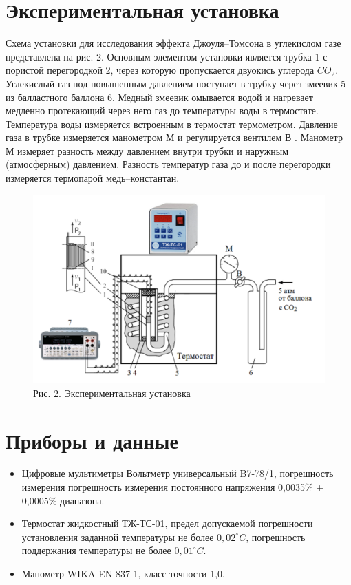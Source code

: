 \documentclass[a4paper]{article}
\begin{document}
\section{Экспериментальная установка}
Схема установки для исследования эффекта Джоуля–Томсона в углекислом газе
представлена на рис. 2. Основным элементом установки является трубка 1 с пористой
перегородкой 2, через которую пропускается двуокись углерода $CO_2$. Углекислый газ под повышенным давлением поступает в трубку через змеевик 5
из балластного баллона 6. Медный змеевик омывается водой и нагревает медленно
протекающий через него газ до температуры воды в термостате. Температура воды
измеряется встроенным в термостат термометром. Давление газа в трубке измеряется манометром М и регулируется вентилем В . Манометр М измеряет разность между давлением внутри трубки и наружным (атмосферным) давлением. Разность температур газа до и после перегородки измеряется термопарой медь–константан.
\begin{figure}[h!]
        \centering
        \includegraphics[scale=0.5]{ustanovka.png}
        \caption{
        Рис. 2. Экспериментальная установка
        }
 \end{figure} 


\section{Приборы и данные}
\begin{itemize}
    \item Цифровые мультиметры Вольтметр универсальный B7-78/1, погрешность измерения погрешность измерения постоянного напряжения 0,0035\% + 0,0005\% диапазона. 
    \item Термостат жидкостный ТЖ-ТС-01, предел допускаемой погрешности установления заданной температуры не более $0,02 ^\circ C$, погрешность поддержания температуры не более $0,01 ^\circ C$.
    \item Манометр WIKA EN 837-1, класс точности 1,0.
\end{itemize}
\end{document}
